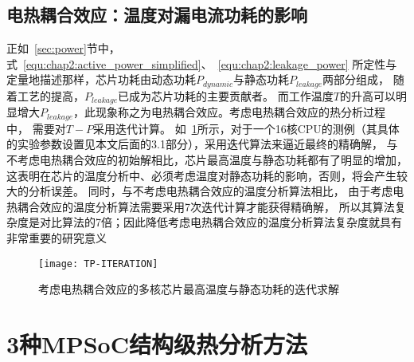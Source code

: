 \subsection{电热耦合效应：温度对漏电流功耗的影响}
正如~\ref{sec:power}节中，式~\ref{equ:chap2:active_power_simplified}、~\ref{equ:chap2:leakage_power} 所定性与定量地描述那样，芯片功耗由动态功耗$P_{dynamic}$与静态功耗$P_{leakage}$两部分组成， 随着工艺的提高，$P_{leakage}$已成为芯片功耗的主要贡献者。 而工作温度$T$的升高可以明显增大$P_{leakage}$，此现象称之为电热耦合效应。考虑电热耦合效应的热分析过程中， 需要对$T-P$采用迭代计算。
如~\ref{fig:tp-iteration}所示，对于一个16核CPU的测例（其具体的实验参数设置见本文后面的3.1部分），采用迭代算法来逼近最终的精确解， 与不考虑电热耦合效应的初始解相比，芯片最高温度与静态功耗都有了明显的增加， 这表明在芯片的温度分析中、必须考虑温度对静态功耗的影响，否则，将会产生较大的分析误差。 同时，与不考虑电热耦合效应的温度分析算法相比， 由于考虑电热耦合效应的温度分析算法需要采用7次迭代计算才能获得精确解， 所以其算法复杂度是对比算法的7倍；因此降低考虑电热耦合效应的温度分析算法复杂度就具有非常重要的研究意义
\begin{figure}[H]
  \centering
  \texttt{[image: TP-ITERATION]}
  \caption{考虑电热耦合效应的多核芯片最高温度与静态功耗的迭代求解}
  \label{fig:tp-iteration}
\end{figure}


\section{3种MPSoC结构级热分析方法}
\label{sec:SSTAmethod}

